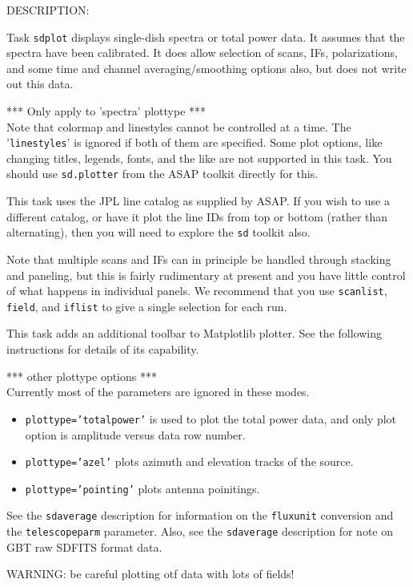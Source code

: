 DESCRIPTION:
    
Task {\tt sdplot} displays single-dish spectra or total power data.
It assumes that the spectra have been calibrated.
It does allow selection of scans, IFs, polarizations, and
some time and channel averaging/smoothing options also,
but does not write out this data.

*** Only apply to 'spectra' plottype ***\\
Note that colormap and linestyles cannot be controlled at a time.
The '{\tt linestyles}' is ignored if both of them are specified.
Some plot options, like changing titles, legends, fonts,
and the like are not supported in this task.  You should use
{\tt sd.plotter} from the ASAP toolkit directly for this.

This task uses the JPL line catalog as supplied by ASAP.
If you wish to use a different catalog, or have it plot
the line IDs from top or bottom (rather than alternating),
then you will need to explore the {\tt sd} toolkit also.

Note that multiple scans and IFs can in principle be handled
through stacking and paneling, but this is fairly rudimentary
at present and you have little control of what happens in
individual panels.  We recommend that you use {\tt scanlist}, {\tt field},
and {\tt iflist} to give a single selection for each run.

This task adds an additional toolbar to Matplotlib plotter. See the following 
instructions for details of its capability.

*** other plottype options ***\\
Currently most of the parameters are ignored in these modes.

\begin{itemize}
\item {\tt plottype='totalpower'} is used to plot the total power data, and only plot option is amplitude versus data row number.
\item {\tt plottype='azel'} plots azimuth and elevation tracks of the source.
\item {\tt plottype='pointing'} plots antenna poinitings.
\end{itemize}

See the {\tt sdaverage} description for information on the {\tt fluxunit} conversion
and the {\tt telescopeparm} parameter.
Also, see the {\tt sdaverage} description for note on GBT raw SDFITS format data.

WARNING: be careful plotting otf data with lots of fields!


